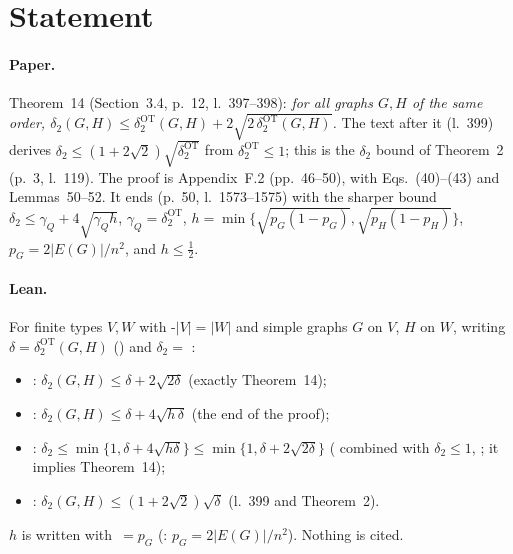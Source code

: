 

\paperversion

\section{Statement}

\paragraph{Paper.} Theorem~14 (Section~3.4, p.~12, l.~397--398): \emph{for all graphs $G,H$ of the same order,
$\delta_2(G,H)\le\delta^{\mathrm{OT}}_2(G,H)+2\sqrt{2\,\delta^{\mathrm{OT}}_2(G,H)}$.} The text after it (l.~399)
derives $\delta_2\le(1+2\sqrt2)\sqrt{\delta^{\mathrm{OT}}_2}$ from $\delta^{\mathrm{OT}}_2\le1$; this is the
$\delta_2$ bound of Theorem~2 (p.~3, l.~119). The proof is Appendix~F.2 (pp.~46--50), with Eqs.~(40)--(43) and
Lemmas~50--52. It ends (p.~50, l.~1573--1575) with the sharper bound
$\delta_2\le\gamma_Q+4\sqrt{\gamma_Qh}$, $\gamma_Q=\delta^{\mathrm{OT}}_2$,
$h=\min\{\sqrt{p_G(1-p_G)},\sqrt{p_H(1-p_H)}\}$, $p_G=2|E(G)|/n^2$, and $h\le\frac12$.

\paragraph{Lean.} For finite types $V,W$ with \hyp{$|V|=|W|$} and simple graphs $G$ on $V$, $H$ on $W$,
writing $\delta=\delta^{\mathrm{OT}}_2(G,H)$ () and $\delta_2=$ :
\begin{itemize}
\item {}: $\delta_2(G,H)\le\delta+2\sqrt{2\delta}$ \quad (exactly Theorem~14);
\item {}: $\delta_2(G,H)\le\delta+4\sqrt{h\,\delta}$ \quad (the end of the proof);
\item {}: $\delta_2\le\min\{1,\delta+4\sqrt{h\delta}\}\le\min\{1,\delta+2\sqrt{2\delta}\}$
  \quad ( combined with $\delta_2\le1$, ; it implies Theorem~14);
\item {}: $\delta_2(G,H)\le(1+2\sqrt2)\sqrt\delta$ \quad (l.~399 and Theorem~2).
\end{itemize}
$h$ is written 
with $\,=p_G$ (: $p_G=2|E(G)|/n^2$). Nothing is cited.

